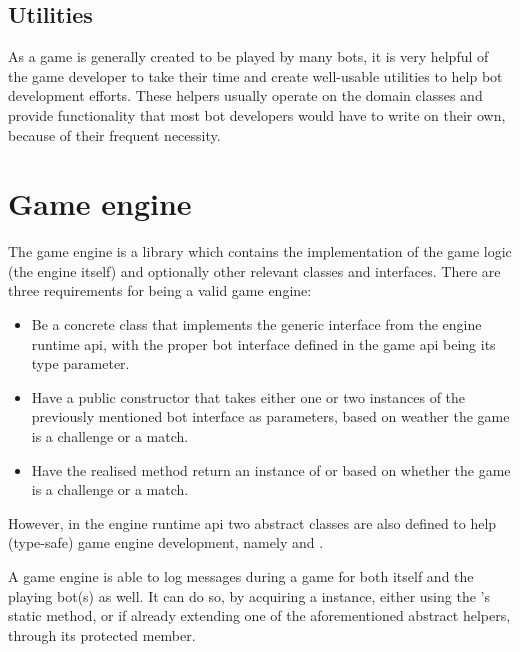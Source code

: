 		\subsection*{Utilities}
		
		As a game is generally created to be played by many bots, it is very helpful of the game developer to take their time and create well-usable utilities to help bot development efforts. These helpers usually operate on the domain classes and provide functionality that most bot developers would have to write on their own, because of their frequent necessity.

	\section{Game engine}
	
	The game engine is a library which contains the implementation of the game logic (the engine itself) and optionally other relevant classes and interfaces. There are three requirements for being a valid game engine:
	
	\begin{itemize}
		\item Be a concrete class that implements the generic  interface from the engine runtime api, with the proper bot interface defined in the game api being its type parameter.
		
		\item Have a public constructor that takes either one or two instances of the previously mentioned bot 
		interface as parameters, based on weather the game is a challenge or a match.
		
		\item Have the realised  method return an instance of  or  based on whether the game is a challenge or a match.
	\end{itemize} 
	
	However, in the engine runtime api two abstract classes are also defined to help (type-safe) game engine development, namely  and .
	
	A game engine is able to log messages during a game for both itself and the playing bot(s) as well. It can do so, by acquiring a  instance, either using the 's static  method, or if already extending one of the aforementioned abstract helpers, through its  protected member.  
	
